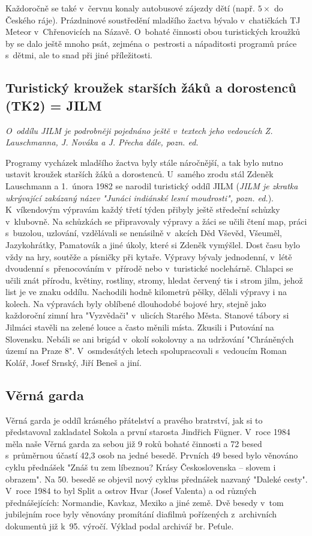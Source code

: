 \documentclass[a5paper, 11pt, twoside]{article}
\newcommand{\pozned}[1]{%
\textit{#1}}
\begin{document}
Každoročně se také v~červnu konaly autobusové zájezdy dětí (např. \(5\times\) do
Českého ráje). Prázdninové soustředění mladšího žactva bývalo
v~chatičkách TJ Meteor v~Chřenovicích na Sázavě. O~bohaté činnosti obou
turistických kroužků by se dalo ještě mnoho psát, zejména o~pestrosti a
nápaditosti programů práce s~dětmi, ale to snad při jiné příležitosti.

\clearpage
\subsection{Turistický kroužek starších žáků a dorostenců (TK2) =
JILM}

\pozned{O~oddílu JILM je podrobněji pojednáno ještě v~textech jeho
vedoucích Z. Lauschmanna, J. Nováka a J. Přecha dále, pozn. ed.}

Programy vycházek mladšího žactva byly stále náročnější, a tak bylo
nutno ustavit kroužek starších žáků a dorostenců. U~samého zrodu stál
Zdeněk Lauschmann a 1.~února 1982 se narodil turistický oddíl JILM
(\textit{JILM je zkratka ukrývající zakázaný název "Junáci indiánské lesní moudrosti", pozn. ed.}). K~víkendovým výpravám každý třetí týden
přibyly ještě středeční schůzky v~klubovně. Na schůzkách se připravovaly
výpravy a žáci se učili čtení map, práci s~buzolou, uzlování, vzdělávali
se nenásilně v~akcích Děd Vševěd, Všeuměl, Jazykohrátky, Pamatovák a
jiné úkoly, které si Zdeněk vymýšlel. Dost času bylo vždy na hry,
soutěže a písničky při kytaře. Výpravy bývaly jednodenní, v~létě
dvoudenní s~přenocováním v~přírodě nebo v~turistické noclehárně. Chlapci
se učili znát přírodu, květiny, rostliny, stromy, hledat červený tis i
strom jilm, jehož list je ve znaku oddílu. Nachodili hodně kilometrů
pěšky, dělali výpravy i na kolech. Na výpravách byly oblíbené dlouhodobé
bojové hry, stejně jako každoroční zimní hra "Vyzvědači" v~ulicích
Starého Města. Stanové tábory si Jilmáci stavěli na zelené louce a často
měnili místa. Zkusili i Putování na Slovensku. Nebáli se ani brigád
v~okolí sokolovny a na udržování "Chráněných území na Praze 8".
V~osmdesátých letech spolupracovali s~vedoucím Roman Kolář, Josef Srnský,
Jiří Beneš a jiní.

\subsection{Věrná garda}

Věrná garda je oddíl krásného přátelství a pravého bratrství, jak si to
představoval zakladatel Sokola a první starosta Jindřich Fügner. V~roce
1984 měla naše Věrná garda za sebou již 9 roků bohaté činnosti a 72
besed s~průměrnou účastí 42,3 osob na jedné besedě. Prvních 49 besed
bylo věnováno cyklu přednášek "Znáš tu zem líbeznou? Krásy
Československa -- slovem i obrazem". Na 50. besedě se objevil nový
cyklus přednášek nazvaný "Daleké cesty". V~roce 1984 to byl Split a
ostrov Hvar (Josef Valenta) a od různých přednášejících: Normandie,
Kavkaz, Mexiko a jiné země. Dvě besedy v~tom jubilejním roce byly
věnovány promítání diafilmů pořízených z~archivních dokumentů již k~95.
výročí. Výklad podal archivář br. Peťule.
\end{document}

